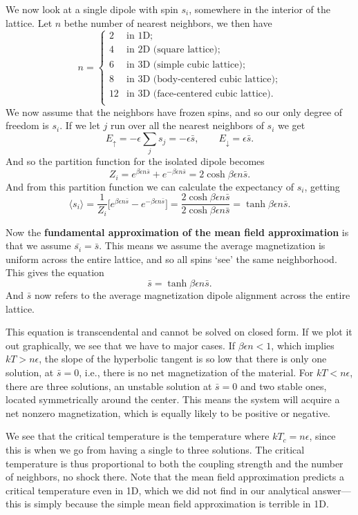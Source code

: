\documentclass[a4paper, 11pt, notitlepage, english]{article}
\newcommand{\up}{\left|\uparrow\rangle\right.}
\newcommand{\down}{\left|\downarrow\rangle\right.}
\newcommand{\eps}{\epsilon}
\renewcommand{\up}{\uparrow}
\renewcommand{\down}{\downarrow}
\begin{document}
We now look at a single dipole with spin $s_i$, somewhere in the interior of the lattice. Let $n$ bethe number of nearest neighbors, we then have
$$n = \begin{cases}
	2 & \mbox{in 1D}; \\
	4 & \mbox{in 2D (square lattice)}; \\
	6 & \mbox{in 3D (simple cubic lattice)}; \\
	8 & \mbox{in 3D (body-centered cubic lattice)}; \\
	12 & \mbox{in 3D (face-centered cubic lattice)}. \\
\end{cases}$$
We now assume that the neighbors have frozen spins, and so our only degree of freedom is $s_i$. If we let $j$ run over all the nearest neighbors of $s_i$ we get
$$E_\up = -\eps \sum_{j} s_j = -\eps\bar{s}, \qquad E_\down = \eps \bar{s}.$$
And so the partition function for the isolated dipole becomes
$$Z_i = e^{\beta \eps n \bar{s}} + e^{-\beta \eps n \bar{s}} = 2\cosh{\beta\eps n\bar{s}}.$$
And from this partition function we can calculate the expectancy of $s_i$, getting
$$\langle s_i \rangle = \frac{1}{Z_i}\bigg[e^{\beta \eps n \bar{s}} - e^{-\beta \eps n \bar{s}} \bigg] = \frac{2\cosh{\beta\eps n\bar{s}}}{2\cosh{\beta\eps n\bar{s}}} = \tanh{\beta\eps n\bar{s}}.$$

Now the \textbf{fundamental approximation of the mean field approximation} is that we assume $\bar{s_i} = \bar{s}$. This means we assume the average magnetization is uniform across the entire lattice, and so all spins `see' the same neighborhood. This gives the equation
$$\bar{s} = \tanh{\beta\eps n\bar{s}}.$$
And $\bar{s}$ now refers to the average magnetization dipole alignment across the entire lattice.

This equation is transcendental and cannot be solved on closed form. If we plot it out graphically, we see that we have to major cases. If $\beta \eps n < 1$, which implies $kT > n\eps$, the slope of the hyperbolic tangent is so low that there is only one solution, at $\bar{s} = 0$, i.e., there is no net magnetization of the material. For $k T < n\eps$, there are three solutions, an unstable solution at $\bar{s} = 0$ and two stable ones, located symmetrically around the center. This means the system will acquire a net nonzero magnetization, which is equally likely to be positive or negative.

We see that the critical temperature is the temperature where $kT_c = n\eps$, since this is when we go from having a single to three solutions. The critical temperature is thus proportional to both the coupling strength and the number of neighbors, no shock there. Note that the mean field approximation predicts a critical temperature even in 1D, which we did not find in our analytical answer---this is simply because the simple mean field approximation is terrible in 1D.
\end{document}
